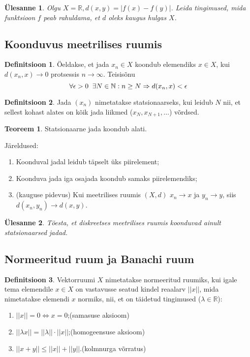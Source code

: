\documentclass{article}[12pt]
\newcommand{\h}{\hspace{0.2cm}}
\newcommand{\R}{\mathbb{R}}
\newcommand{\N}{\mathbb{N}}
\newtheorem{yl}{Ülesanne}[section]
\theoremstyle{definition}
\newtheorem{definition}{Definitsioon}[section]
\theoremstyle{definition}
\newtheorem{theorem}{Teoreem}[section]
\theoremstyle{definition}
\theoremstyle{break}
\begin{document}
\begin{yl}
	Olgu $X=\R, d(x,y) = |f(x)-f(y)|$. Leida tingimused, mida funktsioon $f$ peab rahuldama, et $d$ oleks kaugus hulgas $X$.	
\end{yl}

\subsection{Koonduvus meetrilises ruumis}

\begin{definition}
	Öeldakse, et jada $x_n\in X$ koondub elemendiks $x\in X$, kui $d(x_n,x)\rightarrow 0$ protsessis $n\rightarrow \infty$.
	Teisisõnu
	\[
		\forall \epsilon > 0 \h\exists N\in \N : n\geq N\Rightarrow d(x_n,x)<\epsilon
	\]	
\end{definition}
\begin{definition}
	Jada $(x_n)$ nimetatakse statsionaarseks, kui leidub $N$ nii, et sellest kohast alates on kõik jada liikmed ($x_N,x_{N+1},\dots$) võrdsed.
\end{definition}
\begin{theorem}
	Statsionaarne jada koondub alati.
\end{theorem}

Järeldused:
\begin{enumerate}
	\item Koonduval jadal leidub täpselt üks piirelement;
	\item Koonduva jada iga osajada koondub samaks piirelemendiks;
	\item (kauguse pidevus) Kui meetrilises ruumis $(X,d)$ $x_n\rightarrow x$ ja $y_n \rightarrow y$, siis $d(x_n,y_n)\rightarrow d(x,y)$.
\end{enumerate}

\begin{yl}
	Tõesta, et diskreetses meetrilises ruumis koonduvad ainult statsionaarsed jadad.
\end{yl}

\subsection{Normeeritud ruum ja Banachi ruum}

\begin{definition}
	Vektorruumi $X$ nimetatakse normeeritud ruumiks, kui igale tema elemendile $x\in X$ on vastavusse seatud kindel reaalarv $||x||$, mida nimetatakse elemendi $x$ normiks, nii, et on täidetud tingimused ($\lambda \in \R$):
	\begin{enumerate}
		\item $||x|| = 0 \Leftrightarrow x=0$;\hfill (samasuse aksioom)
		\item $||\lambda x|| = ||\lambda||\cdot ||x||$;\hfill (homogeensuse aksioom)
		\item $||x+y|| \leq ||x|| + ||y||$.\hfill (kolmnurga võrratus)
	\end{enumerate}	
\end{definition}
\end{document}

